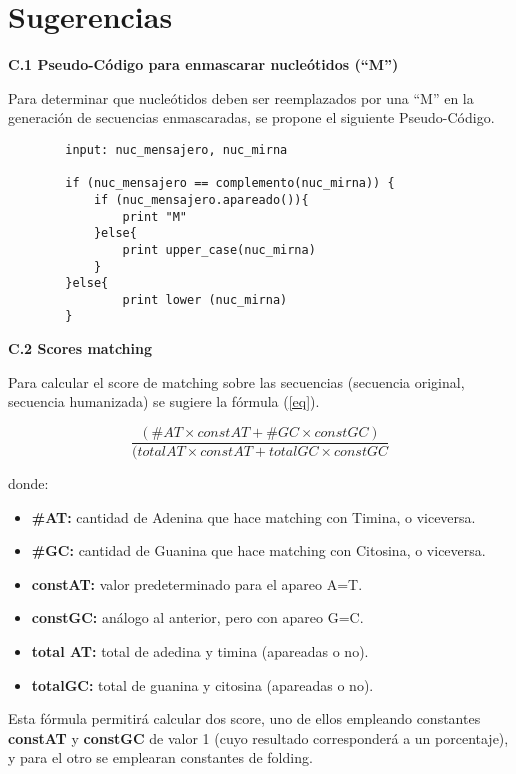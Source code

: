 \section{Sugerencias}
\label{appendix-formulates}

	\large \textbf{C.1 Pseudo-Código para enmascarar nucleótidos (``M'')}
	\par Para determinar que nucleótidos deben ser reemplazados por una ``M'' en la generación de secuencias enmascaradas, 		se propone el siguiente Pseudo-Código.

    \begin{verbatim}
        input: nuc_mensajero, nuc_mirna

        if (nuc_mensajero == complemento(nuc_mirna)) {
            if (nuc_mensajero.apareado()){
                print "M"
            }else{
                print upper_case(nuc_mirna)			
            }	
        }else{
                print lower (nuc_mirna)
        }                
    \end{verbatim}

	\large \textbf{C.2 Scores matching}
	\par Para calcular el score de matching sobre las secuencias (secuencia original, secuencia humanizada) se sugiere la 		fórmula (\ref{eq}).

	\begin{equation}	
		\label{eq} \frac{(\#AT \times constAT + \#GC \times constGC)}{(totalAT \times constAT + totalGC \times constGC}
	\end{equation}	

	\par donde:
		\begin{itemize}
			\item \textbf{\#AT:} cantidad de Adenina que hace matching con Timina, o viceversa.
			\item \textbf{\#GC:} cantidad de Guanina que hace matching con Citosina, o viceversa.
			\item \textbf{constAT:} valor predeterminado para el apareo A=T.
			\item \textbf{constGC:} análogo al anterior, pero con apareo G=C.
			\item \textbf{total AT:} total de adedina y timina (apareadas o no).
			\item \textbf{totalGC:} total de guanina y citosina (apareadas o no).	
		\end{itemize} 

	\par Esta fórmula permitirá calcular dos score, uno de ellos empleando constantes \textbf{constAT} y \textbf{constGC} 		de valor 1 (cuyo resultado corresponderá a un porcentaje), y para el otro se emplearan constantes de folding.
 
